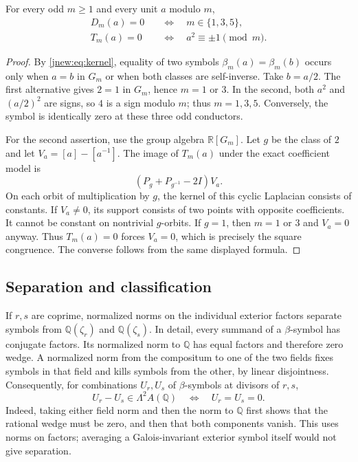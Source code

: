 \begin{lemma}\label{jnew:lem:DT}
For every odd $m\ge1$ and every unit $a$ modulo $m$,
\begin{align}
 D_m(a)=0&\quad\Longleftrightarrow\quad m\in\{1,3,5\},
 \label{jnew:eq:D-zero}\\
 T_m(a)=0&\quad\Longleftrightarrow\quad a^2\equiv\pm1\pmod m.
 \label{jnew:eq:T-zero}
\end{align}
\end{lemma}
\begin{proof}
By \eqref{jnew:eq:kernel}, equality of two symbols
$\beta_m(a)=\beta_m(b)$ occurs only when $a=b$ in $G_m$ or when
both classes are self-inverse. Take $b=a/2$. The first alternative
gives $2=1$ in $G_m$, hence $m=1$ or $3$. In the second,
both $a^2$ and $(a/2)^2$ are signs, so $4$ is a sign modulo $m$;
thus $m=1,3,5$. Conversely, the symbol is identically zero at these
three odd conductors.

For the second assertion, use the group algebra $\mathbb R[G_m]$.
Let $g$ be the class of $2$ and let
$V_a=[a]-[a^{-1}]$. The image of $T_m(a)$ under the exact coefficient
model is
\[
 (P_g+P_{g^{-1}}-2I)V_a.
\]
On each orbit of multiplication by $g$, the kernel of this cyclic
Laplacian consists of constants. If $V_a\ne0$, its support consists
of two points with opposite coefficients. It cannot be constant
on nontrivial $g$-orbits. If $g=1$, then $m=1$ or $3$ and
$V_a=0$ anyway. Thus $T_m(a)=0$ forces $V_a=0$, which is precisely
the square congruence. The converse follows from the same displayed
formula.
\end{proof}

\subsection{Separation and classification}

If $r,s$ are coprime, normalized norms on the individual exterior
factors separate symbols from $\mathbb Q(\zeta_r)$ and
$\mathbb Q(\zeta_s)$. In detail, every summand of a $\beta$-symbol
has conjugate factors. Its normalized norm to $\mathbb Q$ has equal
factors and therefore zero wedge. A normalized norm from the compositum
to one of the two fields fixes symbols in that field and kills symbols
from the other, by linear disjointness. Consequently, for combinations
$U_r,U_s$ of $\beta$-symbols at divisors of $r,s$,
\begin{equation}\label{jnew:eq:separation}
 U_r-U_s\in\Lambda^2 A(\mathbb Q)
 \quad\Longleftrightarrow\quad U_r=U_s=0.
\end{equation}
Indeed, taking either field norm and then the norm to $\mathbb Q$
first shows that the rational wedge must be zero, and then that both
components vanish. This uses norms on factors; averaging a
Galois-invariant exterior symbol itself would not give separation.

